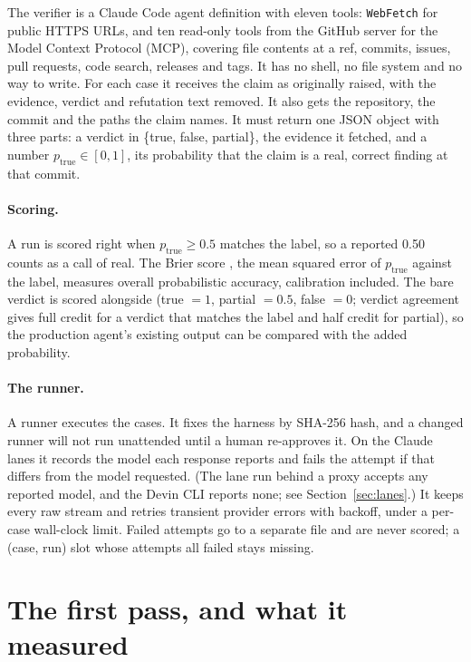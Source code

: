 \documentclass[11pt]{article}
\begin{document}
The verifier is a Claude Code agent definition with eleven tools: \texttt{WebFetch} for public HTTPS URLs, and ten read-only tools from the GitHub server for the Model Context Protocol (MCP), covering file contents at a ref, commits, issues, pull requests, code search, releases and tags. It has no shell, no file system and no way to write. For each case it receives the claim as originally raised, with the evidence, verdict and refutation text removed. It also gets the repository, the commit and the paths the claim names. It must return one JSON object with three parts: a verdict in \{true, false, partial\}, the evidence it fetched, and a number $p_{\text{true}} \in [0,1]$, its probability that the claim is a real, correct finding at that commit.

\paragraph{Scoring.} A run is scored right when $p_{\text{true}} \ge 0.5$ matches the label, so a reported 0.50 counts as a call of real. The Brier score \citep{brier1950}, the mean squared error of $p_{\text{true}}$ against the label, measures overall probabilistic accuracy, calibration included. The bare verdict is scored alongside (true $=1$, partial $=0.5$, false $=0$; verdict agreement gives full credit for a verdict that matches the label and half credit for partial), so the production agent's existing output can be compared with the added probability.

\paragraph{The runner.} A runner executes the cases. It fixes the harness by SHA-256 hash, and a changed runner will not run unattended until a human re-approves it. On the Claude lanes it records the model each response reports and fails the attempt if that differs from the model requested. (The lane run behind a proxy accepts any reported model, and the Devin CLI reports none; see Section~\ref{sec:lanes}.) It keeps every raw stream and retries transient provider errors with backoff, under a per-case wall-clock limit. Failed attempts go to a separate file and are never scored; a (case, run) slot whose attempts all failed stays missing.

\section{The first pass, and what it measured}
\label{sec:first}
\end{document}
